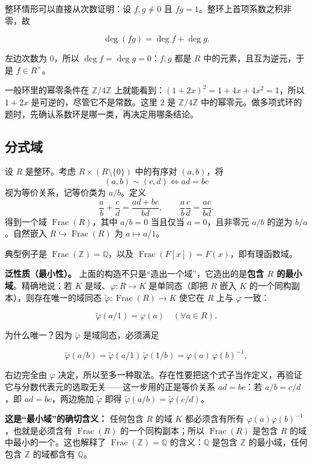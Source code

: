整环情形可以直接从次数证明：设 $f,g\ne0$ 且 $fg=1$。整环上首项系数之积非零，故

\[
\deg(fg)=\deg f+\deg g.
\]

左边次数为 $0$，所以 $\deg f=\deg g=0$：$f,g$ 都是 $R$ 中的元素，且互为逆元，于是 $f\in R^\times$。

一般环里的幂零条件在 $\mathbb Z/4\mathbb Z$ 上就能看到：$(1+2x)^2=1+4x+4x^2=1$，所以 $1+2x$ 是可逆的，尽管它不是常数。这里 $2$ 是 $\mathbb Z/4\mathbb Z$ 中的幂零元。做多项式环的题时，先确认系数环是哪一类，再决定用哪条结论。

\subsection{分式域}


设 $R$ 是整环。考虑 $R\times(R\setminus\{0\})$ 中的有序对 $(a,b)$，将
\[ (a,b)\sim(c,d)\iff ad=bc \]
视为等价关系，记等价类为 $a/b$。定义
\[\frac ab+\frac cd=\frac{ad+bc}{bd},\qquad \frac ab\frac cd=\frac{ac}{bd}.\]
得到一个域 $\operatorname{Frac}(R)$，其中 $a/b=0$ 当且仅当 $a=0$，且非零元 $a/b$ 的逆为 $b/a$。自然嵌入 $R\hookrightarrow\operatorname{Frac}(R)$ 为 $a\mapsto a/1$。

典型例子是 $\operatorname{Frac}(\mathbb Z)=\mathbb Q$，以及 $\operatorname{Frac}(F[x])=F(x)$，即有理函数域。

\textbf{泛性质（最小性）。} 上面的构造不只是“造出一个域”，它造出的是\textbf{包含 $R$ 的最小域}。精确地说：若 $K$ 是域、$\varphi:R\to K$ 是单同态（即把 $R$ 嵌入 $K$ 的一个同构副本），则存在唯一的域同态 $\widetilde{\varphi}:\operatorname{Frac}(R)\to K$ 使它在 $R$ 上与 $\varphi$ 一致：

\[
\widetilde{\varphi}(a/1)=\varphi(a)\quad(\forall a\in R).
\]

为什么唯一？因为 $\widetilde{\varphi}$ 是域同态，必须满足

\[
\widetilde{\varphi}(a/b)=\widetilde{\varphi}(a/1)\,\widetilde{\varphi}(1/b)=\varphi(a)\,\varphi(b)^{-1},
\]

右边完全由 $\varphi$ 决定，所以至多一种取法。存在性要把这个式子当作定义，再验证它与分数代表元的选取无关——这一步用的正是等价关系 $ad=bc$：若 $a/b=c/d$，即 $ad=bc$，两边施加 $\widetilde{\varphi}$ 即得 $\widetilde{\varphi}(a/b)=\widetilde{\varphi}(c/d)$。

\textbf{这是“最小域”的确切含义：} 任何包含 $R$ 的域 $K$ 都必须含有所有 $\varphi(a)\varphi(b)^{-1}$，也就是必须含有 $\operatorname{Frac}(R)$ 的一个同构副本；所以 $\operatorname{Frac}(R)$ 是包含 $R$ 的域中最小的一个。这也解释了 $\operatorname{Frac}(\mathbb Z)=\mathbb Q$ 的含义：$\mathbb Q$ 是包含 $\mathbb Z$ 的最小域，任何包含 $\mathbb Z$ 的域都含有 $\mathbb Q$。

